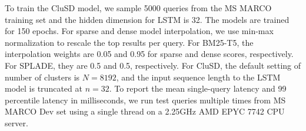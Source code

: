 To train the CluSD model, we sample 5000 queries from the MS MARCO training set 
and the hidden dimension for LSTM is 32. The models are trained for 150 epochs. 
For sparse and dense model interpolation, we use min-max normalization to rescale the top results per query. 
For  BM25-T5, the interpolation  weights are  0.05 and 0.95 for sparse  and  dense scores, respectively. 
For SPLADE, they are  0.5 and  0.5, respectively. 
For CluSD, the default setting of number of clusters is $N=8192$, and the input sequence length to the LSTM model is truncated at $n=32$.  
To report the mean single-query latency and 99 percentile latency in milliseconds,
we  run test queries multiple times  from MS MARCO Dev set using a single thread on  a 2.25GHz AMD EPYC 7742  CPU server. 


